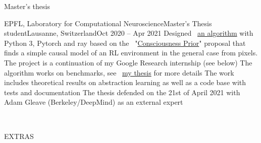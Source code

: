 \documentclass{resume} %
\newcommand*{\mybold}[1]{{\color{gray} #1}}
\def\imgpref{bleak-}
\newcommand{\mylink}{{\color{gray}\faExternalLink}}
\begin{document}
\begin{rSection}{Master's thesis}
	\begin{rSubsection}{EPFL, Laboratory for Computational Neuroscience}{Master's Thesis student}{Lausanne, Switzerland}{Oct 2020 -- Apr 2021}
		\myitem Designed \mylink~\href{https://github.com/sergeivolodin/causality-disentanglement-rl}{an algorithm} with \mybold{Python 3, Pytorch and ray} based on the \mylink~"\href{https://arxiv.org/abs/1709.08568}{Consciousness Prior}" proposal that finds a simple causal model of an RL environment in the general case from pixels. The project is a continuation of my Google Research internship (see below)
		\myitem The algorithm works on benchmarks, see \mylink~\href{https://sergeivolodin.github.io/causality-simplicity/CauseOccam_Learning_Interpretable_Abstract_Representations_in_Reinforcement_Learning_Environments_via_Model_Sparsity.pdf}{my thesis} for more details
		\myitem The work includes \mybold{theoretical results on abstraction learning as well as a code base with tests and documentation}
		\myitem The thesis defended on the 21st of April 2021 with Adam Gleave (Berkeley/DeepMind) as an external expert
	\end{rSubsection}
\end{rSection}

\newpage
\newcommand{\middlewave}[1]{\begin{center} \mybold{\raisebox{0.5em}{\uwave{\hspace{#1}}}} \end{center} }
\,

\def\imgpref{}
\vspace{30pt}
\begin{center}
EXTRAS
\end{center}
\vspace{30pt}

\end{document}
